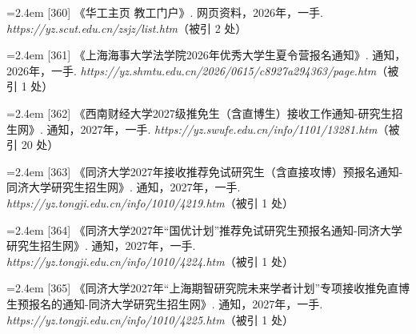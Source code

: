 {\vspace{0.6pt}
\noindent\hangindent=2.4em \label{src:S0481}{\color{cAccent}[360]} 《华工主页 教工门户》. 网页资料，2026年，一手. \textit{https://yz.scut.edu.cn/zsjz/list.htm}（被引 2 处）\par
\vspace{0.6pt}
\vspace{3.5pt}\par
\nopagebreak\vspace{1pt}
\noindent\hangindent=2.4em \label{src:S0482}{\color{cAccent}[361]} 《上海海事大学法学院2026年优秀大学生夏令营报名通知》. 通知，2026年，一手. \textit{https://yz.shmtu.edu.cn/2026/0615/c8927a294363/page.htm}（被引 1 处）\par
\vspace{0.6pt}
\vspace{3.5pt}\par
\nopagebreak\vspace{1pt}
\noindent\hangindent=2.4em \label{src:S0483}{\color{cAccent}[362]} 《西南财经大学2027级推免生（含直博生）接收工作通知-研究生招生网》. 通知，2027年，一手. \textit{https://yz.swufe.edu.cn/info/1101/13281.htm}（被引 20 处）\par
\vspace{0.6pt}
\vspace{3.5pt}\par
\nopagebreak\vspace{1pt}
\noindent\hangindent=2.4em \label{src:S0484}{\color{cAccent}[363]} 《同济大学2027年接收推荐免试研究生（含直接攻博）预报名通知-同济大学研究生招生网》. 通知，2027年，一手. \textit{https://yz.tongji.edu.cn/info/1010/4219.htm}（被引 1 处）\par
\vspace{0.6pt}
\noindent\hangindent=2.4em \label{src:S0486}{\color{cAccent}[364]} 《同济大学2027年“国优计划”推荐免试研究生预报名通知-同济大学研究生招生网》. 通知，2027年，一手. \textit{https://yz.tongji.edu.cn/info/1010/4224.htm}（被引 1 处）\par
\vspace{0.6pt}
\noindent\hangindent=2.4em \label{src:S0487}{\color{cAccent}[365]} 《同济大学2027年“上海期智研究院未来学者计划”专项接收推免直博生预报名的通知-同济大学研究生招生网》. 通知，2027年，一手. \textit{https://yz.tongji.edu.cn/info/1010/4225.htm}（被引 1 处）\par
}
